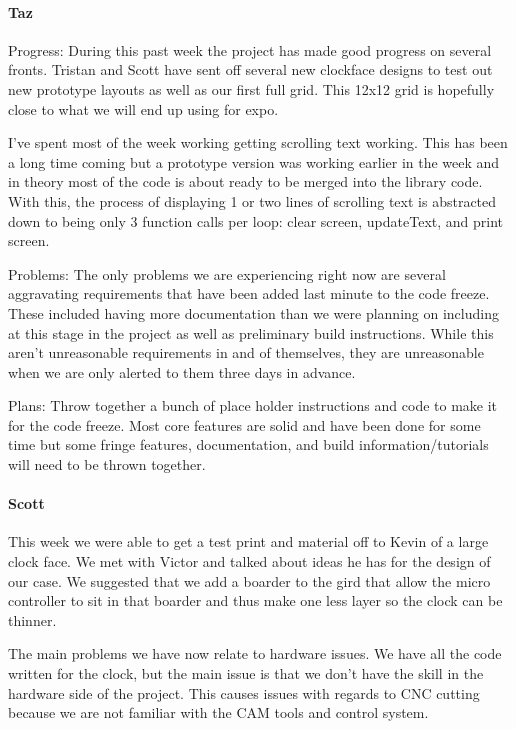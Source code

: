 \documentclass[onecolumn, draftclsnofoot,10pt, compsoc]{IEEEtran}
\begin{document}
\paragraph{Taz}
Progress: During this past week the project has made good progress on several fronts. Tristan and Scott have sent off several new clockface designs to test out new prototype layouts as well as our first full grid. This 12x12 grid is hopefully close to what we will end up using for expo.

I've spent most of the week working getting scrolling text working. This has been a long time coming but a prototype version was working earlier in the week and in theory most of the code is about ready to be merged into the library code. With this, the process of displaying 1 or two lines of scrolling text is abstracted down to being only 3 function calls per loop: clear screen, updateText, and print screen.

Problems: The only problems we are experiencing right now are several aggravating requirements that have been added last minute to the code freeze. These included having more documentation than we were planning on including at this stage in the project as well as preliminary build instructions. While this aren't unreasonable requirements in and of themselves, they are unreasonable when we are only alerted to them three days in advance.

Plans: Throw together a bunch of place holder instructions and code to make it for the code freeze. Most core features are solid and have been done for some time but some fringe features, documentation, and build information/tutorials will need to be thrown together.
\paragraph{Scott}
This week we were able to get a test print and material off to Kevin of a large clock face. We met with Victor and talked about ideas he has for the design of our case. We suggested that we add a boarder to the gird that allow the micro controller to sit in that boarder and thus make one less layer so the clock can be thinner.

The main problems we have now relate to hardware issues. We have all the code written for the clock, but the main issue is that we don't have the skill in the hardware side of the project. This causes issues with regards to CNC cutting because we are not familiar with the CAM tools and control system.
\end{document}
